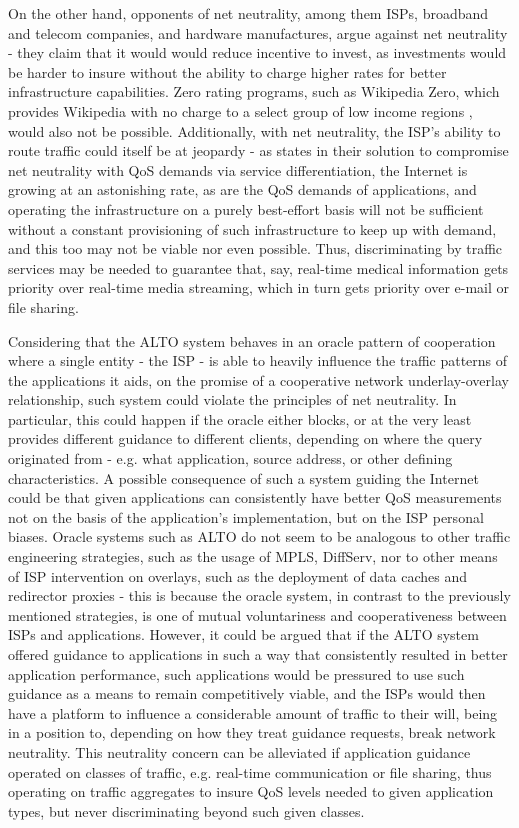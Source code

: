     On the other hand, opponents of net neutrality, among them ISPs, broadband and telecom companies, and hardware manufactures, argue against net neutrality - they claim that it would would reduce incentive to invest, as investments would be harder to insure without the ability to charge higher rates for better infrastructure capabilities.
    Zero rating programs, such as Wikipedia Zero, which provides Wikipedia with no charge to a select group of low income regions  , would also not be possible.
    Additionally, with net neutrality, the ISP's ability to route traffic could itself be at jeopardy - as \cite{jerzy} states in their solution to compromise net neutrality with QoS demands via service differentiation, the Internet is growing at an astonishing rate, as are the QoS demands of applications, and operating the infrastructure on a purely best-effort basis will not be sufficient without a constant provisioning of such infrastructure to keep up with demand, and this too may not be viable nor even possible.
    Thus, discriminating by traffic services may be needed to guarantee that, say, real-time medical information gets priority over real-time media streaming, which in turn gets priority over e-mail or file sharing.

    Considering that the ALTO system behaves in an oracle pattern of cooperation where a single entity - the ISP - is able to heavily influence the traffic patterns of the applications it aids, on the promise of a cooperative network underlay-overlay relationship, such system could violate the principles of net neutrality.
    In particular, this could happen if the oracle either blocks, or at the very least provides different guidance to different clients, depending on where the query originated from - e.g. what application, source address, or other defining characteristics.
    A possible consequence of such a system guiding the Internet could be that given applications can consistently have better QoS measurements not on the basis of the application's implementation, but on the ISP personal biases.
    Oracle systems such as ALTO do not seem to be analogous to other traffic engineering strategies, such as the usage of MPLS, DiffServ, nor to other means of ISP intervention on overlays, such as the deployment of data caches and redirector proxies - this is because the oracle system, in contrast to the previously mentioned strategies, is one of mutual voluntariness and cooperativeness between ISPs and applications.
    However, it could be argued that if the ALTO system offered guidance to applications in such a way that consistently resulted in better application performance, such applications would be pressured to use such guidance as a means to remain competitively viable, and the ISPs would then have a platform to influence a considerable amount of traffic to their will, being in a position to, depending on how they treat guidance requests, break network neutrality.
    This neutrality concern can be alleviated if application guidance operated on classes of traffic, e.g. real-time communication or file sharing, thus operating on traffic aggregates to insure QoS levels needed to given application types, but never discriminating beyond such given classes.

